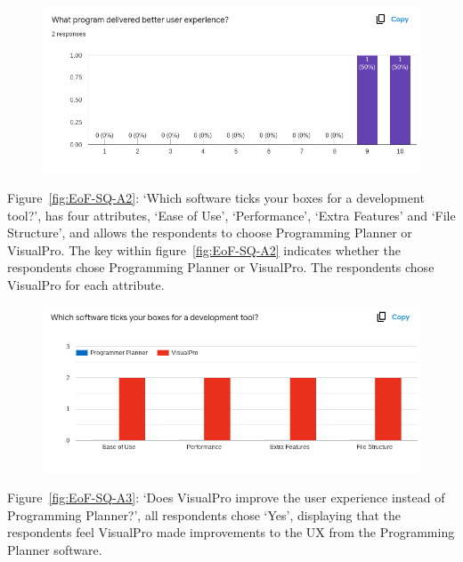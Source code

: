 \documentclass[12pt]{report} %
\begin{document}
			\begin{figure}[H]
				{\includegraphics[scale=0.50]{Figures/VisualPro-Survey_Results/SQ-A1.png}}
			\end{figure}

			Figure~\ref{fig:EoF-SQ-A2}: `Which software ticks your boxes for a development tool?', has four attributes, `Ease of Use', `Performance', `Extra Features' and `File Structure', and allows the respondents to choose Programming Planner or VisualPro. The key within figure~\ref{fig:EoF-SQ-A2} indicates whether the respondents chose Programming Planner or VisualPro. The respondents chose VisualPro for each attribute.

			\begin{figure}[H]
				{\includegraphics[scale=0.50]{Figures/VisualPro-Survey_Results/SQ-A2.png}}
			\end{figure}

			Figure~\ref{fig:EoF-SQ-A3}: `Does VisualPro improve the user experience instead of Programming Planner?', all respondents chose `Yes', displaying that the respondents feel VisualPro made improvements to the UX from the Programming Planner software.
\end{document}
